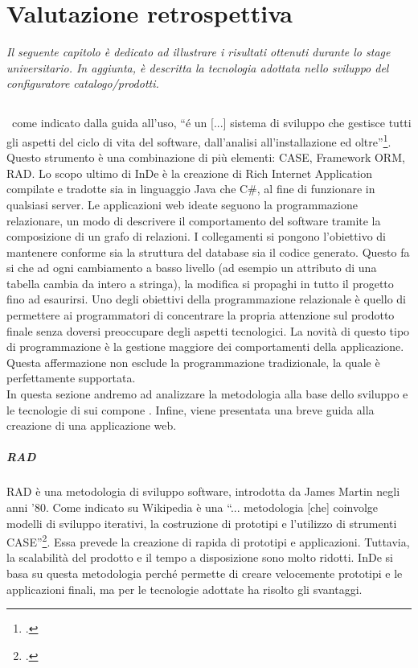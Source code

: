 \chapter{Valutazione retrospettiva}
\textit{Il seguente capitolo è dedicato ad illustrare i risultati ottenuti durante lo stage universitario. In aggiunta, è descritta la tecnologia adottata nello sviluppo del configuratore catalogo/prodotti.}

\section{\inde}
\inde\, come indicato dalla guida all'uso, ``é un [...] sistema di sviluppo che gestisce tutti gli aspetti del ciclo di vita del software, dall'analisi all'installazione ed oltre''\footcite{[11]}.
Questo strumento è una combinazione di più elementi: CASE, Framework ORM, RAD. Lo scopo ultimo di InDe è la creazione di Rich Internet Application compilate e tradotte sia in linguaggio Java che C\#, al fine di funzionare in qualsiasi server.
Le applicazioni web ideate seguono la programmazione relazionare, un modo di descrivere il comportamento del software tramite la composizione di un grafo di relazioni. I collegamenti si pongono l'obiettivo di mantenere conforme sia la struttura del database sia il codice generato. Questo fa si che ad ogni cambiamento a basso livello (ad esempio un attributo di una tabella cambia da intero a stringa), la modifica si propaghi in tutto il progetto fino ad esaurirsi.
Uno degli obiettivi della programmazione relazionale è quello di permettere ai programmatori di concentrare la propria attenzione sul prodotto finale senza doversi preoccupare degli aspetti tecnologici. La novità di questo tipo di programmazione è la gestione maggiore dei comportamenti della applicazione. Questa affermazione non esclude la programmazione tradizionale, la quale è perfettamente supportata.\\

In questa sezione andremo ad analizzare la metodologia alla base dello sviluppo e le tecnologie di sui compone \inde. Infine, viene presentata una breve guida alla creazione di una applicazione web.

\paragraph{RAD}\label{RAD}
RAD è una metodologia di sviluppo software, introdotta da James Martin negli anni '80. Come indicato su Wikipedia è una ``... metodologia [che] coinvolge modelli di sviluppo iterativi, la costruzione di prototipi e l'utilizzo di strumenti CASE''\footcite{[13]}. Essa prevede la creazione di rapida di prototipi e applicazioni. Tuttavia, la scalabilità del prodotto e il tempo a disposizione sono molto ridotti. InDe si basa su questa metodologia perché permette di creare velocemente prototipi e le applicazioni finali, ma per le tecnologie adottate ha risolto gli svantaggi.



